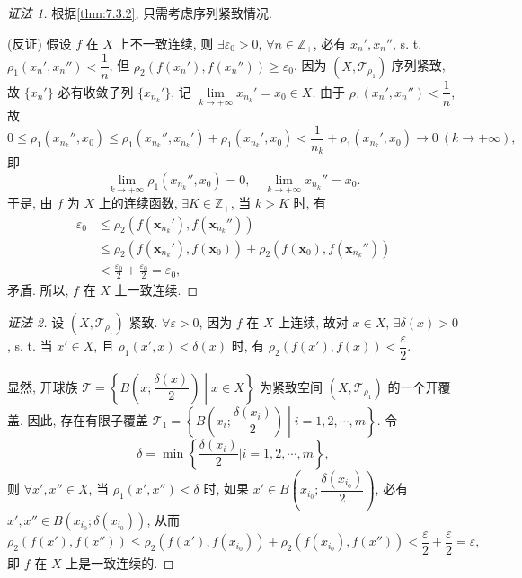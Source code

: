 \begin{proof}[证法 1]
根据\cref{thm:7.3.2}, 只需考虑序列紧致情况.

(反证) 假设 $f$ 在 $X$ 上不一致连续, 则 $\exists \varepsilon_{0} > 0$, $\forall n \in \mathbb{Z}_{+}$, 必有 $x_{n}', x_{n}''$, s. t. $\rho_{1}(x_{n}', x_{n}'') < \dfrac{1}{n}$, 但 $\rho_{2}(f(x_{n}'), f(x_{n}'')) \geqslant \varepsilon_{0}$. 因为 $(X, \mathcal{T}_{\rho_{1}})$ 序列紧致, 故 $\{x_{n}'\}$ 必有收敛子列 $\{x_{n_{k}}'\}$, 记 $\lim\limits_{k \to +\infty} x_{n_{k}}' = x_{0} \in X$. 由于 $\rho_{1}(x_{n}', x_{n}'') < \dfrac{1}{n}$, 故
\[
  0 \leqslant \rho_{1}(x_{n_{k}}'', x_{0}) \leqslant \rho_{1}(x_{n_{k}}'', x_{n_{k}}') + \rho_{1}(x_{n_{k}}', x_{0}) < \frac{1}{n_{k}} + \rho_{1}(x_{n_{k}}', x_{0}) \to 0\ (k \to +\infty),
\]
即
\[
  \lim\limits_{k \to +\infty} \rho_{1}(x_{n_{k}}'', x_{0}) = 0,\quad \lim\limits_{k \to +\infty} x_{n_{k}}'' = x_{0}.
\]
于是, 由 $f$ 为 $X$ 上的连续函数, $\exists K \in \mathbb{Z}_{+}$, 当 $k > K$ 时, 有
\[
  \begin{aligned}
    \varepsilon_{0} &\leqslant \rho_{2}\left(f(\boldsymbol{x}_{n_{k}}'), f(\boldsymbol{x}_{n_{k}}'')\right)\\
    &\leqslant \rho_{2}\left(f(\boldsymbol{x}_{n_{k}}'), f(\boldsymbol{x}_{0})\right) + \rho_{2}\left(f(\boldsymbol{x}_{0}), f(\boldsymbol{x}_{n_{k}}'')\right)\\
    &< \frac{\varepsilon_{0}}{2} + \frac{\varepsilon_{0}}{2} = \varepsilon_{0},
  \end{aligned}
\]
矛盾. 所以, $f$ 在 $X$ 上一致连续. \noqedhere
\end{proof}

\begin{proof}[证法 2]
设 $(X, \mathcal{T}_{\rho_{1}})$ 紧致. $\forall \varepsilon > 0$, 因为 $f$ 在 $X$ 上连续, 故对 $x \in X$, $\exists \delta(x) > 0$, s. t. 当 $x' \in X$, 且 $\rho_{1}(x', x) < \delta(x)$ 时, 有 $\rho_{2}(f(x'), f(x)) < \dfrac{\varepsilon}{2}$.

显然, 开球族 $\mathcal{T} = \left\{B\left(x; \dfrac{\delta(x)}{2}\right) \middle| x \in X\right\}$ 为紧致空间 $(X, \mathcal{T}_{\rho_{1}})$ 的一个开覆盖. 因此, 存在有限子覆盖 $\mathcal{T}_{1} = \left\{B\left(x_{i}; \dfrac{\delta(x_{i})}{2}\right) \middle| i = 1, 2, \cdots, m\right\}$. 令
\[
  \delta = \min\left\{\frac{\delta(x_{i})}{2} \bigg| i = 1, 2, \cdots, m\right\},
\]
则 $\forall x', x'' \in X$, 当 $\rho_{1}(x', x'') < \delta$ 时, 如果 $x' \in B\left(x_{i_{0}}; \dfrac{\delta(x_{i_{0}})}{2}\right)$, 必有 $x', x'' \in B(x_{i_{0}}; \delta(x_{i_{0}}))$, 从而
\[
  \rho_{2}\left(f(x'), f(x'')\right) \leqslant \rho_{2}\left(f(x'), f(x_{i_{0}})\right) + \rho_{2}\left(f(x_{i_{0}}), f(x'')\right) < \frac{\varepsilon}{2} + \frac{\varepsilon}{2} = \varepsilon,
\]
即 $f$ 在 $X$ 上是一致连续的. \noqedhere
\end{proof}

